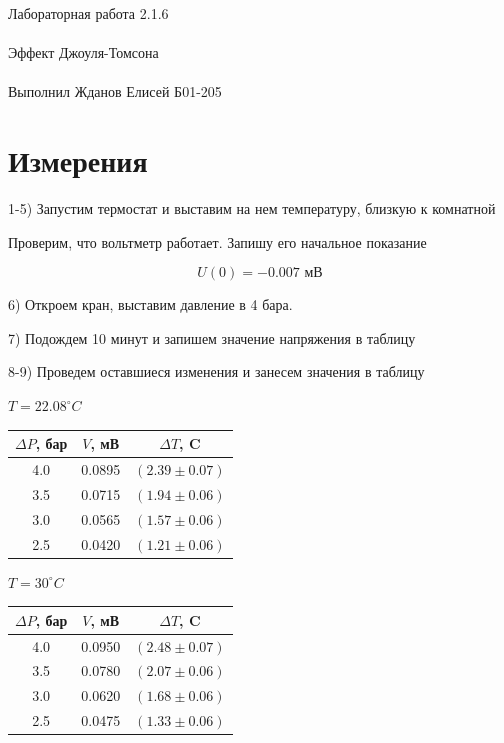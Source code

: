 \documentclass{astroedu-lab}
\begin{document}
\begin{problem}{\huge Лабораторная работа 2.1.6\\\\Эффект Джоуля-Томсона\\\\Выполнил Жданов Елисей Б01-205}
\section{Измерения}

1-5) Запустим термостат и выставим на нем температуру, близкую к комнатной

Проверим, что вольтметр работает. Запишу его начальное показание

\begin{equation}
	U(0) = -0.007 \text{ мВ}
\end{equation}

6) Откроем кран, выставим давление в 4 бара.

7) Подождем 10 минут и запишем значение напряжения в таблицу

8-9) Проведем оставшиеся изменения и занесем значения в таблицу

\begin{center}
	$T = 22.08 ^\circ C$
\end{center}

\begin{center}
\begin{tabular}{|c|c|c|}
\hline
$\Delta P$, бар & $V$, мВ & $\Delta T$, C \\ \hline
4.0 & 0.0895 & $(2.39 \pm 0.07)$ \\
3.5 & 0.0715 & $(1.94 \pm 0.06)$ \\
3.0 & 0.0565 & $(1.57 \pm 0.06)$ \\
2.5 & 0.0420 & $(1.21 \pm 0.06)$ \\
\hline
\end{tabular}
\end{center}

\begin{center}
	$T = 30 ^\circ C$
\end{center}

\begin{center}
\begin{tabular}{|c|c|c|}
\hline
$\Delta P$, бар & $V$, мВ & $\Delta T$, C \\ \hline
4.0 & 0.0950 & $(2.48 \pm 0.07)$ \\
3.5 & 0.0780 & $(2.07 \pm 0.06)$ \\
3.0 & 0.0620 & $(1.68 \pm 0.06)$ \\
2.5 & 0.0475 & $(1.33 \pm 0.06)$ \\
\hline
\end{tabular}
\end{center}


\end{problem}
\end{document}
